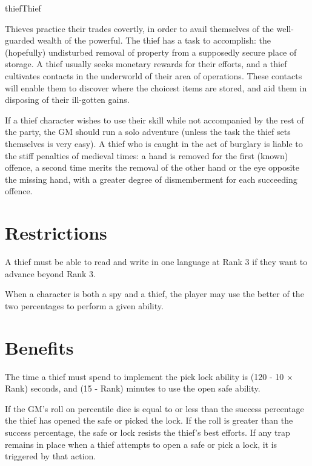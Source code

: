 \begin{Skill}[1.2]{thief}{Thief}

Thieves practice their trades covertly, in order to avail themselves
of the well-guarded wealth of the powerful.  The thief has a task to
accomplish: the (hopefully) undisturbed removal of property from a
supposedly secure place of storage.  A thief usually seeks monetary
rewards for their efforts, and a thief cultivates contacts in the
underworld of their area of operations. These contacts will enable
them to discover where the choicest items are stored, and aid them in
disposing of their ill-gotten gains.

If a thief character wishes to use their skill while not accompanied
by the rest of the party, the GM should run a solo adventure (unless
the task the thief sets themselves is very easy).  A thief who is
caught in the act of burglary is liable to the stiff penalties of
medieval times: a hand is removed for the first (known) offence, a
second time merits the removal of the other hand or the eye opposite
the missing hand, with a greater degree of dismemberment for each
succeeding offence.

\section{Restrictions}

A thief must be able to read and write in one language at Rank 3 if
they want to advance beyond Rank 3.

When a character is both a spy and a thief, the player may use the
better of the two percentages to perform a given ability.

\section{Benefits}


The time a thief must spend to implement the pick lock ability is (120
- 10 × Rank) seconds, and (15 - Rank) minutes to use the open safe
ability.

If the GM’s roll on percentile dice is equal to or less than the
success percentage the thief has opened the safe or picked the lock.
If the roll is greater than the success percentage, the safe or lock
resists the thief’s best efforts.  If any trap remains in place when a
thief attempts to open a safe or pick a lock, it is triggered by that
action.


\end{Skill}
